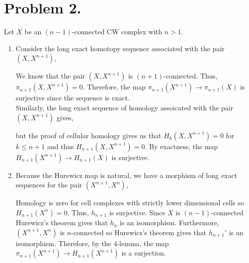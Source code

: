\documentclass[12pt]{extarticle}
\begin{document}
\section*{Problem 2.}
Let $X$ be an $(n-1)$-connected CW complex with $n > 1$.
\begin{enumerate}
\item Consider the long exact homotopy sequence associated with the pair $(X, X^{n+1})$,
\begin{center}
\end{center}
We know that the pair $(X, X^{n+1})$ is $(n+1)$-connected. Thus, $\pi_{n+1}(X, X^{n+1}) = 0$. Therefore, the map $\pi_{n+1}(X^{n+1}) \to \pi_{n+1}(X)$ is surjective since the sequence is exact.
\bigskip\\
Similarly, the long exact sequence of homology assoicated with the pair $(X, X^{n+1})$ gives,
\begin{center}
\end{center} 
but the proof of cellular homology gives us that $H_k(X, X^{n+1}) = 0$ for $k \le n + 1$ and thus $H_{n+1}(X, X^{n+1}) = 0$. By exactness, the map $H_{n+1}(X^{n+1}) \to H_{n+1}(X)$ is surjective.

\item Because the Hurewicz map is natural, we have a morphism of long exact sequences for the pair $(X^{n+1}, X^n)$,
\begin{center}
\end{center}
Homology is zero for cell complexes with strictly lower dimensional cells so $H_{n+1}(X^n) = 0$. Thus, $h_{n+1}$ is surjective. Since $X$ is $(n-1)$-connected Hurewicz's theorem gives that $h_n$ is an isomorphism. Furthermore, $(X^{n+1}, X^{n})$ is $n$-connected so Hurewicz's theorem gives that $h_{n+1}'$ is an isomorphism. Therefore, by the 4-lemma, the map $\pi_{n+1}(X^{n+1}) \to H_{n+1}(X^{n+1})$ is a surjection.


\end{enumerate}
\end{document}
